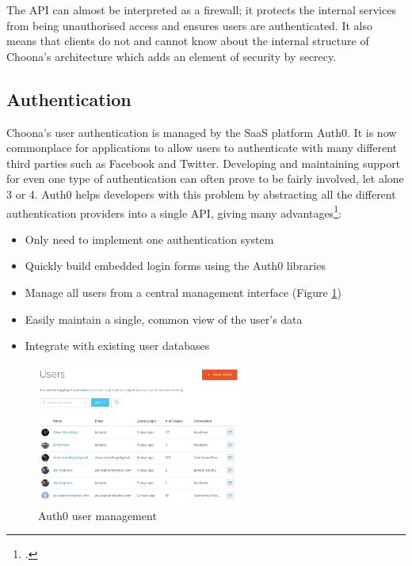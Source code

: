 The API can almost be interpreted as a firewall; it protects the internal services from being unauthorised access and ensures users are authenticated. It also means that clients do not and cannot know about the internal structure of Choona's architecture which adds an element of security by secrecy.


\subsection{Authentication}

Choona's user authentication is managed by the SaaS platform Auth0. It is now commonplace for applications to allow users to authenticate with many different third parties such as Facebook and Twitter. Developing and maintaining support for even one type of authentication can often prove to be fairly involved, let alone 3 or 4. Auth0 helps developers with this problem by abstracting all the different authentication providers into a single API, giving many advantages\footcite{auth0}:

\begin{itemize}
  \item Only need to implement one authentication system
  \item Quickly build embedded login forms using the Auth0 libraries
  \item Manage all users from a central management interface (Figure \ref{fig:auth0-users})
  \item Easily maintain a single, common view of the user's data
  \item Integrate with existing user databases
\end{itemize}

\begin{figure}[h!]
  \centering
  \includegraphics[width=0.6\textwidth]{./img/auth0-users.png}
  \caption{Auth0 user management}
  \label{fig:auth0-users}
\end{figure}

